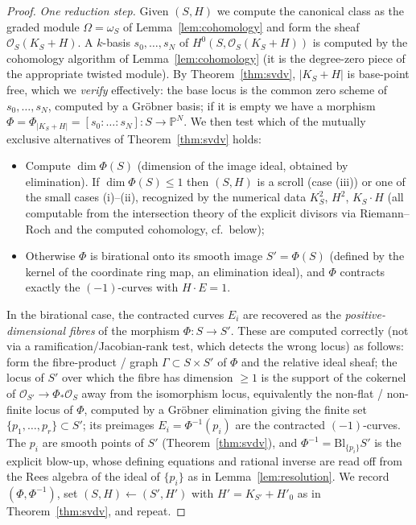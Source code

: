 \documentclass{amsart}
\theoremstyle{plain}
\theoremstyle{definition}
\newcommand{\PP}{\mathbb{P}}
\newcommand{\cO}{\mathcal{O}}
\begin{document}
\begin{proof}
\emph{One reduction step.}  Given $(S,H)$ we compute the canonical class as the
graded module $\Omega=\omega_S$ of Lemma~\ref{lem:cohomology} and form the sheaf
$\cO_S(K_S+H)$.  A $k$-basis $s_0,\dots,s_N$ of
$H^0(S,\cO_S(K_S+H))$ is computed by the cohomology algorithm of
Lemma~\ref{lem:cohomology} (it is the degree-zero piece of the appropriate
twisted module).  By Theorem~\ref{thm:svdv}, $|K_S+H|$ is base-point free, which
we \emph{verify} effectively: the base locus is the common zero scheme of
$s_0,\dots,s_N$, computed by a Gr\"obner basis; if it is empty we have a morphism
$\Phi=\Phi_{|K_S+H|}=[s_0:\dots:s_N]\colon S\to\PP^N$.  We then test which of the
mutually exclusive alternatives of Theorem~\ref{thm:svdv} holds:
\begin{itemize}
\item Compute $\dim\Phi(S)$ (dimension of the image ideal, obtained by
elimination).  If $\dim\Phi(S)\le1$ then $(S,H)$ is a scroll (case (iii)) or one
of the small cases (i)--(ii), recognized by the numerical data
$K_S^2$, $H^2$, $K_S\cdot H$ (all computable from the intersection theory of the
explicit divisors via Riemann--Roch and the computed cohomology, cf.\ below);
\item Otherwise $\Phi$ is birational onto its smooth image $S'=\Phi(S)$ (defined
by the kernel of the coordinate ring map, an elimination ideal), and $\Phi$
contracts exactly the $(-1)$-curves with $H\cdot E=1$.
\end{itemize}
In the birational case, the contracted curves $E_i$ are recovered as the
\emph{positive-dimensional fibres} of the morphism $\Phi\colon S\to S'$.  These
are computed correctly (not via a ramification/Jacobian-rank test, which detects
the wrong locus) as follows: form the fibre-product / graph
$\Gamma\subset S\times S'$ of $\Phi$ and the relative ideal sheaf; the locus of
$S'$ over which the fibre has dimension $\ge1$ is the support of the cokernel of
$\cO_{S'}\to\Phi_*\cO_S$ away from the isomorphism locus, equivalently the
non-flat / non-finite locus of $\Phi$, computed by a Gr\"obner elimination
giving the finite set $\{p_1,\dots,p_r\}\subset S'$; its preimages
$E_i=\Phi^{-1}(p_i)$ are the contracted $(-1)$-curves.  The $p_i$ are smooth
points of $S'$ (Theorem~\ref{thm:svdv}), and $\Phi^{-1}=\mathrm{Bl}_{\{p_i\}}S'$
is the explicit blow-up, whose defining equations and rational inverse are read
off from the Rees algebra of the ideal of $\{p_i\}$ as in
Lemma~\ref{lem:resolution}.  We record $(\Phi,\Phi^{-1})$, set $(S,H)\leftarrow(S',H')$ with
$H'=K_{S'}+H'_0$ as in Theorem~\ref{thm:svdv}, and repeat.


\end{proof}
\end{document}
